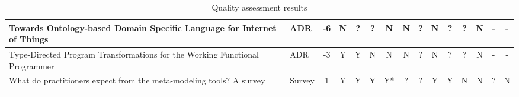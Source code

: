 \begin{landscape}
\begin{longtable}{ | p{11cm} | l | *{13}{c|} }
        Towards Ontology-based Domain Specific Language for Internet of Things\cite{negm2020towards_SLR}                                                                       & ADR               &  -6   & N & ? & ? & N & N & ? & N & ? & ? & N  & - & - \\\hline
        Type-Directed Program Transformations for the Working Functional Programmer\cite{lubin2020type_SLR}                                                                    & ADR               &  -3   & Y & Y & N & N & N & ? & N & ? & ? & N  & - & - \\\hline
        What do practitioners expect from the meta-modeling tools? A survey\cite{ozkaya2021practitioners_SLR}                                                                  & Survey            &  1    & Y & Y & Y & Y* & ? & ? & Y & Y & N & N  & ? & N \\\hline
        \caption{Quality assessment results}
        \label{table:QA_Results}
    \end{longtable}
\end{landscape}
